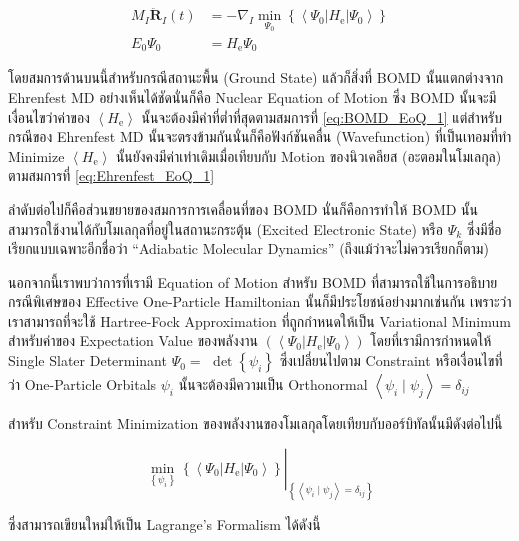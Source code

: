 \begin{align}
  \label{eq:BOMD_EoQ_1}
  M_I \ddot{\mathbf{R}}_I(t)
   & =
  -\nabla_I \min _{\Psi_0}\left\{\left\langle\Psi_0\left| H_{\mathrm{e}}\right| \Psi_0\right\rangle\right\} \\
  \label{eq:BOMD_EoQ_2}
  E_0 \Psi_0
   & =
  H_{\mathrm{e}} \Psi_0
\end{align}

\noindent โดยสมการด้านบนนี้สำหรับกรณีสถานะพื้น (Ground State) แล้วก็สิ่งที่ BOMD นั้นแตกต่างจาก Ehrenfest MD อย่างเห็นได้ชัดนั่นก็คือ
Nuclear Equation of Motion ซึ่ง BOMD นั้นจะมีเงื่อนไขว่าค่าของ $\left\langle H_{\mathrm{e}}\right\rangle$
นั้นจะต้องมีค่าที่ต่ำที่สุดตามสมการที่ \eqref{eq:BOMD_EoQ_1} แต่สำหรับกรณีของ Ehrenfest MD นั้นจะตรงข้ามกันนั่นก็คือฟังก์ชันคลื่น
(Wavefunction) ที่เป็นเทอมที่ทำ Minimize $\left\langle H_{\mathrm{e}}\right\rangle$ นั้นยังคงมีค่าเท่าเดิมเมื่อเทียบกับ
Motion ของนิวเคลียส (อะตอมในโมเลกุล) ตามสมการที่ \eqref{eq:Ehrenfest_EoQ_1}

ลำดับต่อไปก็คือส่วนขยายของสมการการเคลื่อนที่ของ BOMD นั่นก็คือการทำให้ BOMD นั้นสามารถใช้งานได้กับโมเลกุลที่อยู่ในสถานะกระตุ้น (Excited
Electronic State) หรือ $\Psi_k$ ซึ่งมีชื่อเรียกแบบเฉพาะอีกชื่อว่า \enquote{Adiabatic Molecular Dynamics} (ถึงแม้ว่าจะไม่ควรเรียกก็ตาม)

นอกจากนี้เราพบว่าการที่เรามี Equation of Motion สำหรับ BOMD ที่สามารถใช้ในการอธิบายกรณีพิเศษของ Effective One-Particle Hamiltonian
นั้นก็มีประโยชน์อย่างมากเช่นกัน เพราะว่าเราสามารถที่จะใช้ Hartree-Fock Approximation ที่ถูกกำหนดให้เป็น Variational Minimum
สำหรับค่าของ Expectation Value ของพลังงาน $(\left\langle\Psi_0\left| H_{\mathrm{e}}\right| \Psi_0\right\rangle)$
โดยที่เรามีการกำหนดให้ Single Slater Determinant $\Psi_0=$ $\operatorname{det}\left\{\psi_i\right\}$ ซึ่งเปลี่ยนไปตาม
Constraint หรือเงื่อนไขที่ว่า One-Particle Orbitals $\psi_i$ นั้นจะต้องมีความเป็น Orthonormal
$\left\langle\psi_i \mid \psi_j\right\rangle=\delta_{i j}$

สำหรับ Constraint Minimization ของพลังงานของโมเลกุลโดยเทียบกับออร์บิทัลนั้นมีดังต่อไปนี้

\begin{equation}
  \label{eq:BOMD_min_constraint}
  \left.\min _{\left\{\psi_i\right\}}\left\{\left\langle\Psi_0\left|
  H_{\mathrm{e}}\right| \Psi_0\right\rangle\right\}\right
  |_{\left\{\left\langle\psi_i \mid \psi_j\right\rangle=\delta_{i j}\right\}}
\end{equation}

\noindent ซึ่งสามารถเขียนใหม่ให้เป็น Lagrange's Formalism ได้ดังนี้

